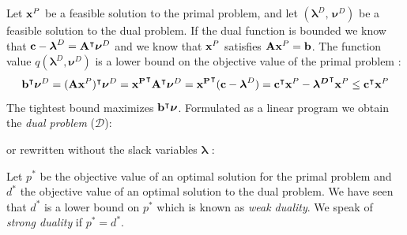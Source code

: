 Let $\bold x^P$ be a feasible solution to the primal problem, and let $(\boldsymbol \lambda^D, \, \boldsymbol \nu^D)$ be a feasible solution to the dual problem. If the dual function is bounded we know that $\bold c - \boldsymbol \lambda^D = \bold A^\intercal \boldsymbol \nu^D$ and we know that $\bold x^P$ satisfies $ \bold A\bold x^P = \bold b$. The function value $q(\boldsymbol \lambda^D, \boldsymbol \nu^D)$ is a lower bound on the objective value of the primal problem \cite{aps_mosek_nodate}: 
\begin{equation*}
    \bold b^\intercal \boldsymbol \nu^D
    = (\bold A \bold x^P)^\intercal \boldsymbol \nu^D 
    = \bold {x^P}^\intercal \bold A^\intercal \boldsymbol \nu^D 
    = \bold {x^P}^\intercal (\bold c - \boldsymbol \lambda^D) 
    = \bold c^\intercal \bold x^P  - \boldsymbol {\lambda^D}^\intercal \bold x^P
    \leq \bold c^\intercal \bold x^P
\end{equation*}
The tightest bound maximizes $\bold b^\intercal \boldsymbol \nu$. Formulated as a linear program we obtain the \textit{dual problem} ($\mathcal{D}$):
or rewritten without the slack variables $\boldsymbol \lambda$ \cite{noauthor_numerical_2006}:
Let $p^*$ be the objective value of an optimal solution for the primal problem and $d^*$ the objective value of an optimal solution to the dual problem. We have seen that $d^*$ is a lower bound on $p^*$ which is known as \textit{weak duality}. We speak of \textit{strong duality} if $p^*=d^*$. 

